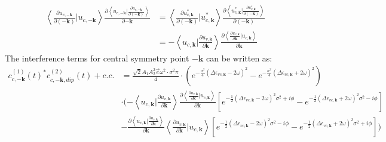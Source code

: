  \begin{align}
     \left \langle \frac{\partial u_{v,-\mathbf k}}{\partial (-\mathbf k)} |  u_{c,-\mathbf k} \right \rangle \frac{\partial{\left \langle u_{c,-\mathbf k}\Big |\frac{\partial u_{v,-\mathbf k}}{\partial (-\mathbf k)} \right \rangle}}{\partial {-\mathbf k}} 
     &=
     \left \langle \frac{\partial u_{v,\mathbf k}^*}{\partial (-\mathbf k)} |  u_{c,\mathbf k}^* \right \rangle \frac{\partial{\left \langle u_{c,\mathbf k}^*\Big |\frac{\partial u_{v,\mathbf k}^*}{\partial (-\mathbf k)} \right \rangle}}{\partial {(-\mathbf k)}} \\
     &=
     -\left \langle  u_{c,\mathbf k}| \frac{\partial u_{v,\mathbf k}}{\partial \mathbf k} \right \rangle 
     \frac{\partial{\left \langle \frac{\partial u_{v,\mathbf k}}{\partial \mathbf k} \Big |u_{c,\mathbf k} \right \rangle}}{\partial {\mathbf k}} 
 \end{align}
 The interference terms for central symmetry point $-\mathbf k$ can be written as:
\begin{equation}
\begin{aligned}
    c^{(1)}_{c,-\mathbf k}(t)^* c^{(2)}_{c,-\mathbf k,dip}(t) +c.c.&=\frac{\sqrt{2}A_1A_2^2 \vec e \omega ^2 \cdot \sigma^2 \pi}{4}\cdot(e^{-\frac{\sigma^2}{4} (\Delta \epsilon_{vc,\mathbf k}-2\omega )^2}-e^{-\frac{\sigma^2}{4} (\Delta \epsilon_{vc,\mathbf k}+2\omega )^2})\\
    &\cdot (-\left \langle u_{c,\mathbf k} \big | \frac{\partial u_{v,\mathbf k}}{\partial \mathbf k}  \right \rangle \frac{\partial{\left \langle\frac{\partial u_{v,\mathbf k}}{\partial \mathbf k}\Big |u_{c,\mathbf k}\right \rangle}}{\partial {\mathbf k}}
    [e^{-\frac{1}{2}(\Delta \epsilon_{vc,\mathbf k} - 2\omega )^2 \sigma^2+i\phi}
    -e^{-\frac{1}{2}(\Delta \epsilon_{vc,\mathbf k} + 2\omega )^2 \sigma^2-i\phi}]\\
    &-\frac{\partial{\left \langle u_{c,\mathbf k}\Big |\frac{\partial u_{v,\mathbf k}}{\partial \mathbf k} \right \rangle}}{\partial {\mathbf k}}
    \left \langle \frac{\partial u_{v,\mathbf k}}{\partial \mathbf k} |  u_{c,\mathbf k} \right \rangle
     [e^{-\frac{1}{2}(\Delta \epsilon_{vc,\mathbf k} - 2\omega )^2 \sigma^2-i\phi}
    -e^{-\frac{1}{2}(\Delta \epsilon_{vc,\mathbf k} + 2\omega )^2 \sigma^2+i\phi}]
    )
\end{aligned}
\end{equation}

